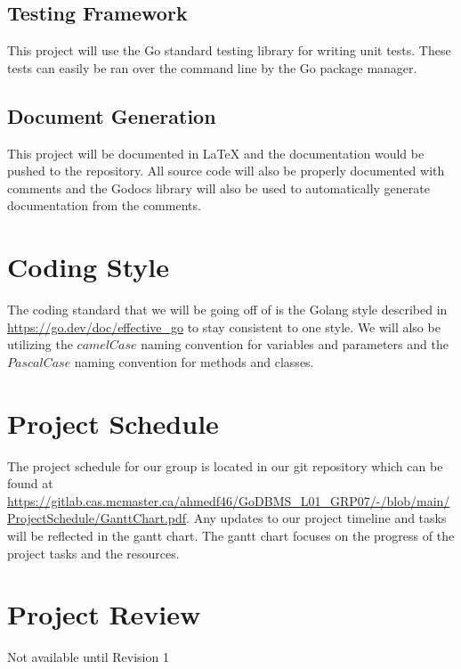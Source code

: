 \documentclass[12pt,letterpaper]{article}
\begin{document}
\subsection{Testing Framework}

This project will use the Go standard testing library for writing unit tests. These tests can easily be ran over the command line by the Go package manager.

\subsection{Document Generation}

This project will be documented in LaTeX and the documentation would be pushed to the repository. All source code will also be properly documented with comments and the Godocs library will also be used to automatically generate documentation from the comments.

\section{Coding Style}

The coding standard that we will be going off of is the Golang style described in \url{https://go.dev/doc/effective_go} to stay consistent to one style. We will also be utilizing the $camelCase$ naming convention for variables and parameters and the $PascalCase$ naming convention for methods and classes.

\section{Project Schedule}

The project schedule for our group is located in our git repository which can be found at \url{https://gitlab.cas.mcmaster.ca/ahmedf46/GoDBMS_L01_GRP07/-/blob/main/ProjectSchedule/GanttChart.pdf}. Any updates to our project timeline and tasks will be reflected in the gantt chart. The gantt chart focuses on the progress of the project tasks and the resources. 

\section{Project Review}

Not available until Revision 1
\end{document}
